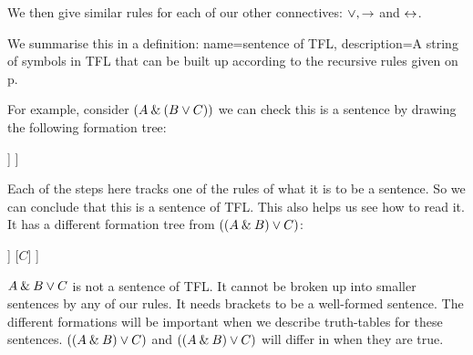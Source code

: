 We then give similar rules for each of our other connectives: $\vee, \rightarrow$ and $\leftrightarrow$.

We summarise this in a definition:
{
name=sentence of TFL,
description={A string of symbols in TFL that can be built up according to the recursive rules given on p.~\pageref{TFLsentences}}
}

For example, consider $(A \mathbin{\&} (B \vee C))$ we can check this is a sentence by drawing the following formation tree:
\label{S:formationtree}
\begin{center}
\begin{forest}
	[$(A\mainconnective{\eand} (B\eor C))$
		[$A$]
		[$(B\mainconnective{\eor} C)$
			[$B$]
			[$C$]
		]
	]
\end{forest}
\end{center}
Each of the steps here tracks one of the rules of what it is to be a sentence. So we can conclude that this is a sentence of TFL. This also helps us see how to read it.
It has a different formation tree from $((A\mathbin{\&} B)\vee C)$:
\begin{center}
\begin{forest}
	[$((A{\eand} B)\mainconnective{\eor} C))$
		[$(A\mainconnective{\eand} B)$
			[$A$]
			[$B$]
		]
		[$C$]
	]
\end{forest}
\end{center}
$A\mathbin{\&} B\vee C$ is not a sentence of TFL. It cannot be broken up into smaller sentences by any of our rules. It needs brackets to be a well-formed sentence.
The different formations will be important when we describe truth-tables for these sentences. $((A\mathbin{\&} B)\vee C)$ and $((A\mathbin{\&} B)\vee C)$ will differ in when they are true.



